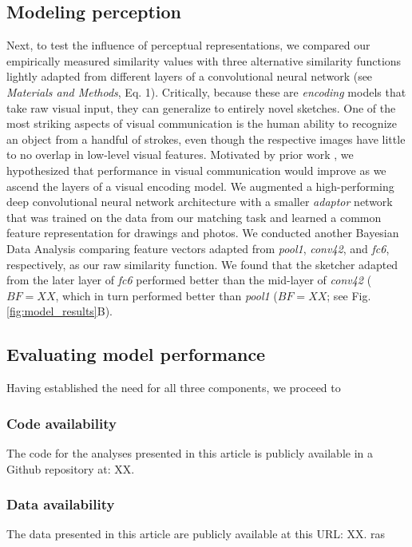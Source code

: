 \documentclass[9pt,twocolumn,twoside]{pnas-new}
\begin{document}
\subsection*{Modeling perception}
Next, to test the influence of perceptual representations, we compared our empirically measured similarity values with three alternative similarity functions lightly adapted from different layers of a convolutional neural network (see \emph{Materials and Methods}, Eq. 1). Critically, because these are \emph{encoding} models that take raw visual input, they can generalize to entirely novel sketches. One of the most striking aspects of visual communication is the human ability to recognize an object from a handful of strokes, even though the respective images have little to no overlap in low-level visual features. Motivated by prior work \cite{fan2015common}, we hypothesized that performance in visual communication would improve as we ascend the layers of a visual encoding model.  We augmented a high-performing deep convolutional neural network architecture with a smaller \emph{adaptor} network that was trained on the data from our matching task and learned a common feature representation for drawings and photos. We conducted another Bayesian Data Analysis comparing feature vectors adapted from \emph{pool1}, \emph{conv42}, and \emph{fc6}, respectively, as our raw similarity function. We found that the sketcher adapted from the later layer of \emph{fc6} performed better than the mid-layer of \emph{conv42} ($BF= XX$, which in turn performed better than \emph{pool1} ($BF = XX$; see Fig. \ref{fig:model_results}B).

\subsection*{Evaluating model performance}
Having established the need for all three components, we proceed to


\subsubsection*{Code availability} The code for the analyses presented in this article is publicly available in a Github repository at: XX.

\subsubsection*{Data availability} The data presented in this article are publicly available at this URL: XX.
ras
\end{document}
